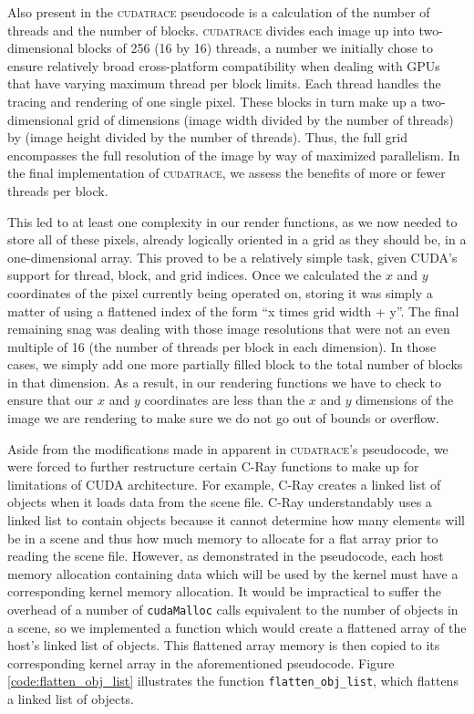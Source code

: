 \documentclass[12pt]{article}
\begin{document}
Also present in the \textsc{cudatrace} pseudocode is a calculation of the number of threads and the number of blocks. \textsc{cudatrace} divides each image up into two-dimensional blocks of 256 (16 by 16) threads, a number we initially chose to ensure relatively broad cross-platform compatibility when dealing with GPUs that have varying maximum thread per block limits. Each thread handles the tracing and rendering of one single pixel. These blocks in turn make up a two-dimensional grid of dimensions (image width divided by the number of threads) by (image height divided by the number of threads). Thus, the full grid encompasses the full resolution of the image by way of maximized parallelism. In the final implementation of \textsc{cudatrace}, we assess the benefits of more or fewer threads per block.

This led to at least one complexity in our render functions, as we now needed to store all of these pixels, already logically oriented in a grid as they should be, in a one-dimensional array. This proved to be a relatively simple task, given CUDA's support for thread, block, and grid indices. Once we calculated the $x$ and $y$ coordinates of the pixel currently being operated on, storing it was simply a matter of using a flattened index of the form “x times grid width + y”. The final remaining snag was dealing with those image resolutions that were not an even multiple of 16 (the number of threads per block in each dimension). In those cases, we simply add one more partially filled block to the total number of blocks in that dimension. As a result, in our rendering functions we have to check to ensure that our $x$ and $y$ coordinates are less than the $x$ and $y$ dimensions of the image we are rendering to make sure we do not go out of bounds or overflow. 

Aside from the modifications made in apparent in \textsc{cudatrace}'s pseudocode, we were forced to further restructure certain C-Ray functions to make up for limitations of CUDA architecture. For example, C-Ray creates a linked list of objects when it loads data from the scene file. C-Ray understandably uses a linked list to contain objects because it cannot determine how many elements will be in a scene and thus how much memory to allocate for a flat array prior to reading the scene file. However, as demonstrated in the pseudocode, each host memory allocation containing data which will be used by the kernel must have a corresponding kernel memory allocation. It would be impractical to suffer the overhead of a number of \texttt{cudaMalloc} calls equivalent to the number of objects in a scene, so we implemented a function which would create a flattened array of the host's linked list of objects. This flattened array memory is then copied to its corresponding kernel array in the aforementioned pseudocode. Figure \ref{code:flatten_obj_list} illustrates the function \texttt{flatten\_obj\_list}, which flattens a linked list of objects.
\end{document}
